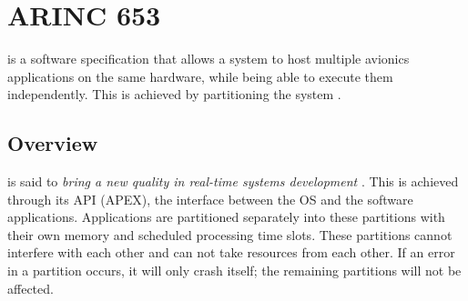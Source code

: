 \section{ARINC 653}
\arinc{} is a software specification that allows a system to host
multiple avionics applications on the same hardware, while being able
to execute them independently. This is achieved by partitioning the
system \cite{arinc_page_2}.

\subsection{Overview}
\label{ssec:interpart_comm}
\arinc{} is said to \textit{bring a new quality in real-time systems
development} \cite{arinc_scarlett}.
This is achieved through its API (APEX), the interface between
the OS and the software applications.
Applications are partitioned separately into these partitions
with their own memory and scheduled processing time slots.
These partitions cannot interfere with each other and can
not take resources from each other.
If an error in a partition occurs, it will only crash itself;
the remaining partitions will not be affected.

